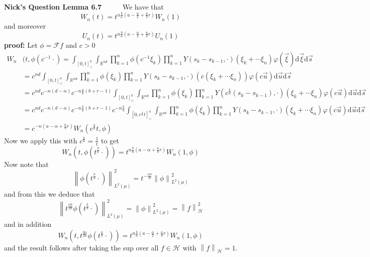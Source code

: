 \documentclass[a4paper,11pt]{article}
\numberwithin{equation}{section}
\theoremstyle{plain}
\theoremstyle{definition}
\newcommand{\ud}{\ensuremath{\mathrm{d} }}
\newcommand{\Norm}[1]{\left\|  #1   \right\|}
\newcommand{\R}{\mathbb{R}}
\newcounter{NQ}
\newenvironment{NickQuestion}[1][] %
{\refstepcounter{NQ}
	\begin{mdframed}[backgroundcolor=lightgray]\textbf{Nick's Question \theNQ \: #1~~}~~~\noindent}%
	{\end{mdframed}}
\numberwithin{NQ}{section}
\numberwithin{LQ}{section}
\numberwithin{ZQ}{section}
\begin{document}
	\begin{NickQuestion}[Lemma 6.7]
		We have that
		\[
		W_n(t) = t^{n\frac{b}{a}\left(a- \frac{\alpha}{2}+\frac{a}{b}r \right)} W_n(1)
		\]
		and moreover
		\[
		U_n(t) = t^{n\frac{b}{a}\left(a- \frac{\alpha}{2}+\frac{a}{b}r \right)} U_n(1)
		\]
		\textbf{proof:} Let $\phi = \mathcal{F}f$ and $c>0$
		\begin{align*}
		W_n & (t,\phi(c^{-1}\cdot) = \int_{[0,t]^n_<}\int_{\R^{nd}} \prod_{k=1}^n \phi(c^{-1}\xi_k) \prod_{k=1}^n Y(s_k - s_{k-1},\cdot)(\xi_k + \cdots \xi_n) \varphi(\vec{\xi})\ud \vec{\xi} \ud \vec{s}
		\\&= c^{nd} \int_{[0,t]^n_<}\int_{\R^{nd}} \prod_{k=1}^n \phi(\xi_k) \prod_{k=1}^n Y(s_k - s_{k-1},\cdot)(c(\xi_k + \cdots \xi_n)) \varphi(c\vec{u})\ud \vec{u} \ud \vec{s}
		\\&= c^{nd}c^{-n(d-\alpha)}c^{-n\frac{a}{b}(b+r-1)} \int_{[0,t]^n_<}\int_{\R^{nd}} \prod_{k=1}^n \phi(\xi_k) \prod_{k=1}^n Y\left(c^{\frac{b}{a}}(s_k - s_{k-1}),\cdot\right)(\xi_k + \cdots \xi_n) \varphi(c\vec{u})\ud \vec{u} \ud \vec{s}
		\\&= c^{nd}c^{-n(d-\alpha)}c^{-n\frac{a}{b}(b+r-1)} c^{-n\frac{a}{b}} \int_{\left[0,c^{\frac{a}{b}}t\right]^n_<}\int_{\R^{nd}} \prod_{k=1}^n \phi(\xi_k) \prod_{k=1}^n Y\left(s_k - s_{k-1},\cdot\right)(\xi_k + \cdots \xi_n) \varphi(c\vec{u})\ud \vec{u} \ud \vec{s}
		\\&= c^{-n\left( a- \alpha +\frac{a}{b}r \right)} W_n\left(c^{\frac{a}{b}}t,\phi \right)
		\end{align*}
		Now we apply this with $c^{\frac{a}{b}} = \frac{1}{t}$ to get
		\[
		W_n\left(t,\phi(t^{\frac{b}{a}}\cdot) \right)= t^{n\frac{b}{a}\left( a- \alpha +\frac{a}{b}r \right)} W_n\left(1,\phi \right)
		\]
		Now note that
		\[
		\Norm{\phi(t^{\frac{b}{a}} \cdot )}_{L^2(\mu)}^2 = t^{-\frac{\alpha b }{a}}\Norm{\phi}_{L^2(\mu)}^2
		\]
		and from this we deduce that
		\[
		\Norm{t^{\frac{\alpha b }{2 a}}\phi(t^{\frac{b}{a}} \cdot )}_{L^2(\mu)}^2 =  \Norm{\phi}_{L^2(\mu)}^2 = \Norm{f}_{\mathcal{H}}^2
		\]
		and in addition
		\[
		W_n\left(t,t^{\frac{b \alpha}{2 a}}\phi(t^{\frac{a}{b}}\cdot) \right)= t^{n\frac{b}{a}\left( a- \frac{\alpha}{2} +\frac{a}{b}r \right)} W_n\left(1,\phi \right)
		\]
		and the result follows after taking the sup over all $f \in \mathcal{H}$ with $\Norm{f}_\mathcal{H} =1$.
	\end{NickQuestion}
\end{document}
